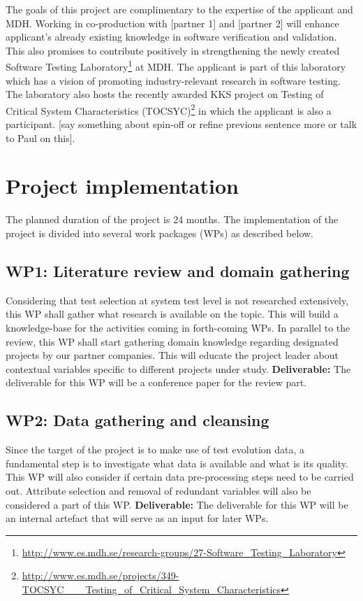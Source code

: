 \documentclass[11pt, oneside]{article}   	%
\begin{document}
The goals of this project are complimentary to the expertise of the applicant and MDH. Working in co-production with [partner 1] and [partner 2] will enhance applicant's already existing knowledge in software verification and validation. This also promises to contribute positively in strengthening the newly created Software Testing Laboratory\footnote{\url{http://www.es.mdh.se/research-groups/27-Software_Testing_Laboratory}} at MDH. The applicant is part of this laboratory which has a vision of promoting industry-relevant research in software testing. The laboratory also hosts the recently awarded KKS project on Testing of Critical System Characteristics (TOCSYC)\footnote{\url{http://www.es.mdh.se/projects/349-TOCSYC___Testing_of_Critical_System_Characteristics}} in which the applicant is also a participant. [say something about spin-off or refine previous sentence more or talk to Paul on this].

\section{Project implementation}\label{sec:proj_implementation}
The planned duration of the project is 24 months. The implementation of the project is divided into several work packages (WPs) as described below. 

\subsection{WP1: Literature review and domain gathering}\label{sec:WP1}
Considering that test selection at system test level is not researched extensively, this WP shall gather what research is available on the topic. This will build a knowledge-base for the activities coming in forth-coming WPs. In parallel to the review, this WP shall start gathering domain knowledge regarding designated projects by our partner companies. This will educate the project leader about contextual variables specific to different projects under study.  \textbf{Deliverable:} The deliverable for this WP will be a conference paper for the review part.

\subsection{WP2: Data gathering and cleansing}\label{sec:WP2}
Since the target of the project is to make use of test evolution data, a fundamental step is to investigate what data is available and what is its quality. This WP will also consider if certain data pre-processing steps need to be carried out. Attribute selection and removal of redundant variables will also be considered a part of this WP.  \textbf{Deliverable:} The deliverable for this WP will be an internal artefact that will serve as an input for later WPs.
\end{document}
